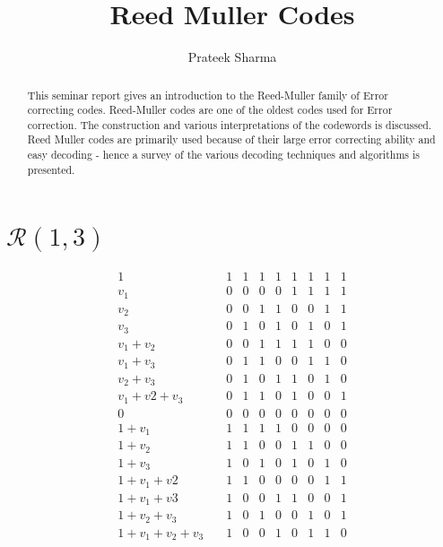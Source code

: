 \documentclass[]{article}
\title{Reed Muller Codes}
\author{Prateek Sharma}
\begin{document}
\maketitle

\begin{abstract}
This seminar report gives an introduction to the Reed-Muller family of Error correcting codes. Reed-Muller codes are one of the oldest codes used for Error correction. The construction and various interpretations of the codewords is discussed. Reed Muller codes are primarily used because of their large error correcting ability and easy decoding - hence a survey of the various decoding techniques and algorithms is presented.
\end{abstract}

\newcommand{\RM}[2]{\ensuremath{\mathcal{R}(#1,#2)}}
\newcommand{\rm}{Reed-Muller}

\section {\RM{1}{3}}

\begin{equation}
\begin{array}{l|cccccccc}
1 \quad&  	 1&1&1&1&1&1&1&1 \\

v_1 \quad& 	 0&0&0&0&1&1&1&1 \\
v_2 \quad& 	 0&0&1&1&0&0&1&1 \\
v_3 \quad&	 0&1&0&1&0&1&0&1 \\
v_1+v_2 \quad&    0&0&1&1&1&1&0&0 \\
v_1+v_3 \quad&	 0&1&1&0&0&1&1&0 \\
v_2+v_3 \quad&	 0&1&0&1&1&0&1&0 \\
v_1+v2+v_3 \quad& 0&1&1&0&1&0&0&1 \\

0	\quad&	 0&0&0&0&0&0&0&0 \\
1+v_1	\quad&	 1&1&1&1&0&0&0&0 \\
1+v_2	\quad&	 1&1&0&0&1&1&0&0 \\
1+v_3	\quad&	 1&0&1&0&1&0&1&0 \\
1+v_1+v2 \quad&	 1&1&0&0&0&0&1&1 \\
1+v_1+v3 \quad&	 1&0&0&1&1&0&0&1 \\
1+v_2+v_3 \quad&	 1&0&1&0&0&1&0&1 \\
1+v_1+v_2+v_3\quad& 1&0&0&1&0&1&1&0 \\

\end{array}

\end{equation}
\end{document}
